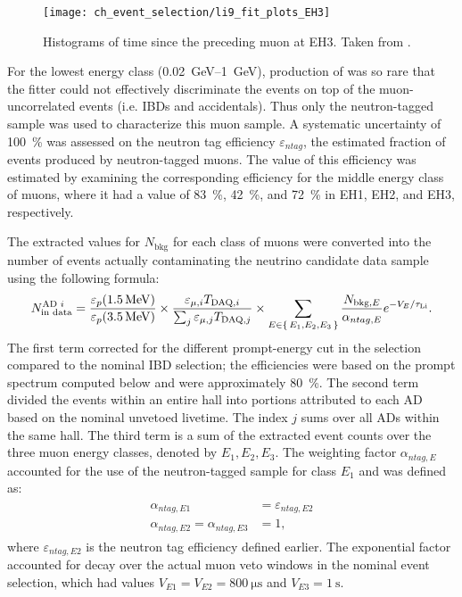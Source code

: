 \begin{figure}
    \centering
    \texttt{[image: ch\_event\_selection/li9\_fit\_plots\_EH3]}
    \caption[Time-since-muon histograms for EH3]{
        Histograms of time since the preceding muon at EH3.
        Taken from \cite{jinjing_2020may}.
    }
    \label{fig:li9_fits_EH3}
\end{figure}

For the lowest energy class (\SIrange{0.02}{1}{\GeV}),
production of \li{} was so rare that the fitter
could not effectively discriminate the \li{} events
on top of the muon-uncorrelated events (i.e. IBDs and accidentals).
Thus only the neutron-tagged sample was used to characterize this muon sample.
A systematic uncertainty of \SI{100}{\percent} was assessed
on the neutron tag efficiency $\varepsilon_{ntag}$,
the estimated fraction of \li{} events produced by neutron-tagged muons.
The value of this efficiency was estimated by examining
the corresponding efficiency for the middle energy class of muons,
where it had a value of \SI{83}{\percent}, \SI{42}{\percent}, and \SI{72}{\percent}
in EH1, EH2, and EH3, respectively.

The extracted values for $N_\text{bkg}$ for each class of muons
were converted into the number of \li{} events
actually contaminating the neutrino candidate data sample
using the following formula:
\begin{equation}\label{eq:li9_rate_conv}
    N_\text{in data}^{\text{AD }i} =
    \frac{\varepsilon_p(\SI{1.5}{\MeV})}{\varepsilon_p(\SI{3.5}{\MeV})}
    \times
    \frac{\varepsilon_{\mu,i} T_{\text{DAQ},i}}{
        \sum_j \varepsilon_{\mu,j} T_{\text{DAQ},j}
    }
    \times
    \sum_{E\in\set{E_1,E_2,E_3}}
    \frac{N_{\text{bkg},E}}{\alpha_{ntag, E}} e^{-V_E/\tau_{\text{Li}}}.
\end{equation}
The first term corrected for the different prompt-energy cut
in the \li{} selection compared to the nominal IBD selection;
the efficiencies were based on the \li{} prompt spectrum computed below
and were approximately \SI{80}{\percent}.
The second term divided the events within an entire hall
into portions attributed to each AD based on the nominal unvetoed livetime.
The index $j$ sums over all ADs within the same hall.
The third term is a sum of the extracted event counts
over the three muon energy classes, denoted by $E_1,E_2,E_3$.
The weighting factor $\alpha_{ntag,E}$ accounted
for the use of the neutron-tagged sample for class $E_1$
and was defined as:
\begin{align}
    \begin{split}
        \alpha_{ntag,E1} &= \varepsilon_{ntag,E2} \\
        \alpha_{ntag,E2} = \alpha_{ntag,E3} &= 1,
    \end{split}
\end{align}
where $\varepsilon_{ntag,E2}$ is the neutron tag efficiency defined earlier.
The exponential factor accounted for \li{} decay
over the actual muon veto windows in the nominal event selection,
which had values $V_{E1} = V_{E2} = \SI{800}{\us}$
and $V_{E3} = \SI{1}{\s}$.

